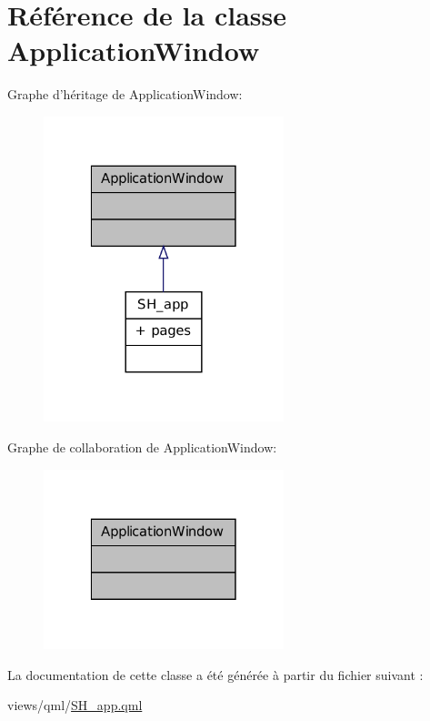 \hypertarget{classApplicationWindow}{\section{Référence de la classe Application\-Window}
\label{classApplicationWindow}
}


Graphe d'héritage de Application\-Window\-:
\nopagebreak
\begin{figure}[H]
\begin{center}
\leavevmode
\includegraphics[width=198pt]{classApplicationWindow__inherit__graph}
\end{center}
\end{figure}


Graphe de collaboration de Application\-Window\-:
\nopagebreak
\begin{figure}[H]
\begin{center}
\leavevmode
\includegraphics[width=198pt]{classApplicationWindow__coll__graph}
\end{center}
\end{figure}


La documentation de cette classe a été générée à partir du fichier suivant \-:\begin{DoxyCompactItemize}
\item 
views/qml/\hyperlink{SH__app_8qml}{S\-H\-\_\-app.\-qml}\end{DoxyCompactItemize}
